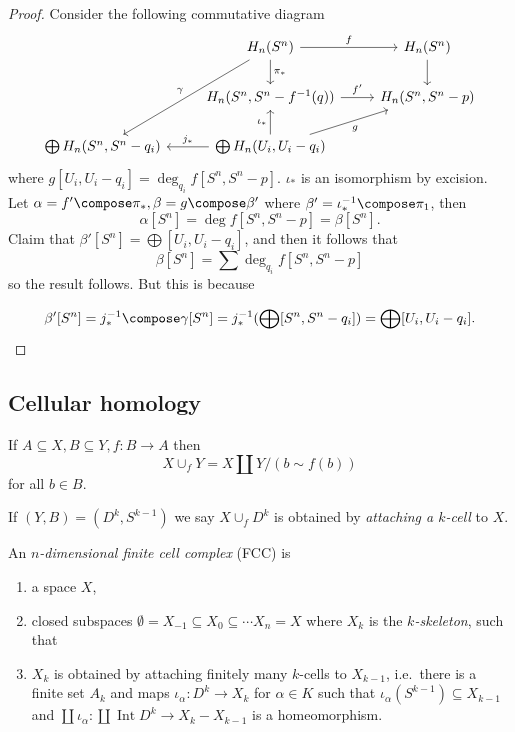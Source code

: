 \documentclass[a4paper]{article}
\DeclareMathOperator{\Int}{Int} %
\begin{document}
\begin{proof}
  Consider the following commutative diagram
  \[
    \begin{tikzcd}
      & H_n(S^n) \ar[r, "f"] \ar[d, "\pi_*"] \ar[ddl, "\gamma"'] & H_n(S^n) \ar[d] \\
      &H_n(S^n, S^n - f^{-1}(q)) \ar[r, "f'"] & H_n(S^n, S^n - p) \\
      \bigoplus H_n(S^n, S^n - q_i) & \bigoplus H_n(U_i, U_i - q_i) \ar[u, "\iota_*"] \ar[ur, "g"'] \ar[l, "j_*"']
    \end{tikzcd}
  \]
  where \(g [U_i, U_i - q_i] = \deg_{q_i} f[S^n, S^n - p]\). \(\iota_*\) is an isomorphism by excision. Let \(\alpha = f' \compose \pi_*, \beta = g \compose \beta'\) where \(\beta' = \iota_*^{-1} \compose \pi_1\), then
  \[
    \alpha[S^n] = \deg f [S^n, S^n - p] = \beta[S^n].
  \]
  Claim that \(\beta'[S^n]  = \bigoplus [U_i, U_i - q_i]\), and then it follows that
  \[
    \beta[S^n] = \sum \deg_{q_i} f [S^n, S^n - p]
  \]
  so the result follows. But this is because

    \[
      \beta'[S^n] = j_*^{-1} \compose \gamma [S^n] = j_*^{-1}(\bigoplus [S^n, S^n - q_i]) = \bigoplus [U_i, U_i - q_i].
    \]
\end{proof}

\subsection{Cellular homology}

\begin{definition}
  If \(A \subseteq X, B \subseteq Y, f: B \to A\) then
  \[
    X \cup_f Y = X \amalg Y/(b \sim f(b))
  \]
  for all \(b \in B\).

  If \((Y, B) = (D^k, S^{k - 1})\) we say \(X \cup_f D^k\) is obtained by \emph{attaching a \(k\)-cell} to \(X\).
\end{definition}

\begin{definition}
  An \emph{\(n\)-dimensional finite cell complex} (FCC) is
  \begin{enumerate}
  \item a space \(X\),
  \item closed subspaces \(\emptyset = X_{-1} \subseteq X_0 \subseteq \cdots X_n = X\) where \(X_k\) is the \emph{\(k\)-skeleton}, such that
  \item \(X_k\) is obtained by attaching finitely many \(k\)-cells to \(X_{k - 1}\), i.e.\ there is a finite set \(A_k\) and maps \(\iota_\alpha: D^k \to X_k\) for \(\alpha \in K\) such that \(\iota_\alpha(S^{k - 1}) \subseteq X_{k - 1}\) and \(\coprod \iota_\alpha: \coprod \Int D^k \to X_k - X_{k - 1}\) is a homeomorphism.
  \end{enumerate}
\end{definition}
\end{document}
